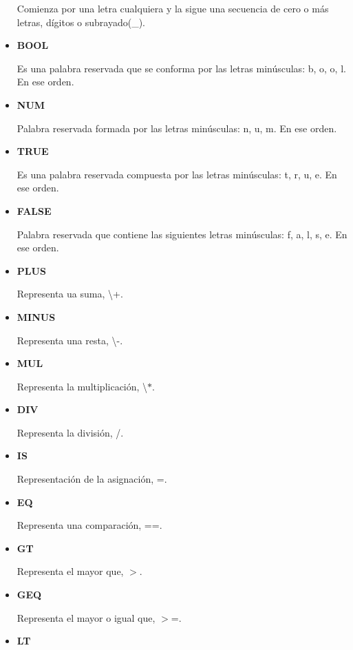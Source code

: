 \documentclass[\main/MemoriaPL.tex]{subfiles}
\begin{document}
\begin{itemize}
            Comienza por una letra cualquiera y la sigue una secuencia de cero o más letras, dígitos o subrayado(\_).
      \item \textbf{BOOL}
            \par \noindent
            Es una palabra reservada que se conforma por las letras minúsculas: b, o, o, l. En ese orden.
      \item \textbf{NUM}
            \par \noindent
            Palabra reservada formada por las letras minúsculas: n, u, m. En ese orden.
      \item \textbf{TRUE}
            \par \noindent
            Es una palabra reservada compuesta por las letras minúsculas: t, r, u, e. En ese orden.
      \item \textbf{FALSE}
            \par \noindent
            Palabra reservada que contiene las siguientes letras minúsculas: f, a, l, s, e. En ese orden.
      \item \textbf{PLUS}
            \par \noindent
            Representa ua suma, \textbackslash +.
      \item \textbf{MINUS}
            \par \noindent
            Representa una resta, \textbackslash -.
      \item \textbf{MUL}
            \par \noindent
            Representa la multiplicación, \textbackslash $\ast$.
      \item \textbf{DIV}
            \par \noindent
            Representa la división, /.
      \item \textbf{IS}
            \par \noindent
            Representación de la asignación, =.
      \item \textbf{EQ}
            \par \noindent
            Representa una comparación, ==.
      \item \textbf{GT}
            \par \noindent
            Representa el mayor que, $>$.
      \item \textbf{GEQ}
            \par \noindent
            Representa el mayor o igual que, $>$=.
      \item \textbf{LT}
            \par \noindent

\end{itemize}
\end{document}
